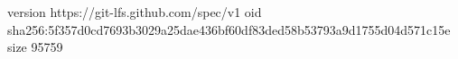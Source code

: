 version https://git-lfs.github.com/spec/v1
oid sha256:5f357d0cd7693b3029a25dae436bf60df83ded58b53793a9d1755d04d571c15e
size 95759
